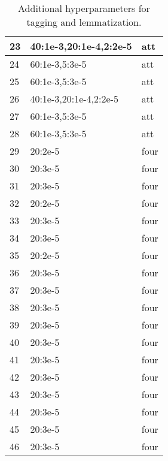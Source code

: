 \begin{table}[!h]
{\begin{tabular}{|l||ll|}
23 & 40:1e-3,20:1e-4,2:2e-5 & att  \\ \hline
24 & 60:1e-3,5:3e-5         & att  \\ \hline
25 & 60:1e-3,5:3e-5         & att  \\ \hline
26 & 40:1e-3,20:1e-4,2:2e-5 & att  \\ \hline
27 & 60:1e-3,5:3e-5         & att  \\ \hline
28 & 60:1e-3,5:3e-5         & att  \\ \hline
29 & 20:2e-5                & four \\ \hline
30 & 20:3e-5                & four \\ \hline
31 & 20:3e-5                & four \\ \hline
32 & 20:2e-5                & four \\ \hline
33 & 20:3e-5                & four \\ \hline
34 & 20:3e-5                & four \\ \hline
35 & 20:2e-5                & four \\ \hline
36 & 20:3e-5                & four \\ \hline
37 & 20:3e-5                & four \\ \hline
38 & 20:3e-5                & four \\ \hline
39 & 20:3e-5                & four \\ \hline
40 & 20:3e-5                & four \\ \hline
41 & 20:3e-5                & four \\ \hline
42 & 20:3e-5                & four \\ \hline
43 & 20:3e-5                & four \\ \hline
44 & 20:3e-5                & four \\ \hline
45 & 20:3e-5                & four \\ \hline
46 & 20:3e-5                & four \\ \hline
\end{tabular}}
\caption{Additional hyperparameters for tagging and lemmatization.}
\end{table}